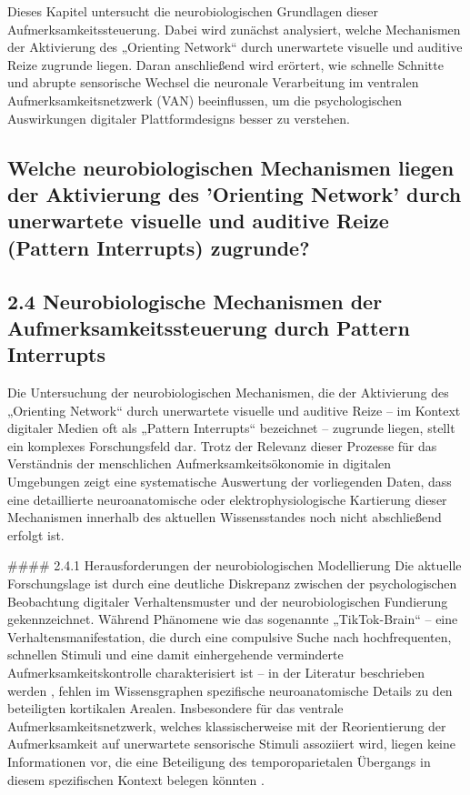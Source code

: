 \documentclass[11pt,a4paper]{article}
\begin{document}
Dieses Kapitel untersucht die neurobiologischen Grundlagen dieser Aufmerksamkeitssteuerung. Dabei wird zunächst analysiert, welche Mechanismen der Aktivierung des „Orienting Network“ durch unerwartete visuelle und auditive Reize zugrunde liegen. Daran anschließend wird erörtert, wie schnelle Schnitte und abrupte sensorische Wechsel die neuronale Verarbeitung im ventralen Aufmerksamkeitsnetzwerk (VAN) beeinflussen, um die psychologischen Auswirkungen digitaler Plattformdesigns besser zu verstehen.

\subsection{Welche neurobiologischen Mechanismen liegen der Aktivierung des 'Orienting Network' durch unerwartete visuelle und auditive Reize (Pattern Interrupts) zugrunde?}

\subsection{2.4 Neurobiologische Mechanismen der Aufmerksamkeitssteuerung durch Pattern Interrupts}

Die Untersuchung der neurobiologischen Mechanismen, die der Aktivierung des „Orienting Network“ durch unerwartete visuelle und auditive Reize – im Kontext digitaler Medien oft als „Pattern Interrupts“ bezeichnet – zugrunde liegen, stellt ein komplexes Forschungsfeld dar. Trotz der Relevanz dieser Prozesse für das Verständnis der menschlichen Aufmerksamkeitsökonomie in digitalen Umgebungen zeigt eine systematische Auswertung der vorliegenden Daten, dass eine detaillierte neuroanatomische oder elektrophysiologische Kartierung dieser Mechanismen innerhalb des aktuellen Wissensstandes noch nicht abschließend erfolgt ist.

\#\#\#\# 2.4.1 Herausforderungen der neurobiologischen Modellierung Die aktuelle Forschungslage ist durch eine deutliche Diskrepanz zwischen der psychologischen Beobachtung digitaler Verhaltensmuster und der neurobiologischen Fundierung gekennzeichnet. Während Phänomene wie das sogenannte „TikTok-Brain“ – eine Verhaltensmanifestation, die durch eine compulsive Suche nach hochfrequenten, schnellen Stimuli und eine damit einhergehende verminderte Aufmerksamkeitskontrolle charakterisiert ist – in der Literatur beschrieben werden \autocite{crossref_10_51473_rcmos_v1i2_2025_1736}, fehlen im Wissensgraphen spezifische neuroanatomische Details zu den beteiligten kortikalen Arealen. Insbesondere für das ventrale Aufmerksamkeitsnetzwerk, welches klassischerweise mit der Reorientierung der Aufmerksamkeit auf unerwartete sensorische Stimuli assoziiert wird, liegen keine Informationen vor, die eine Beteiligung des temporoparietalen Übergangs in diesem spezifischen Kontext belegen könnten \autocite{arxiv_2112_03879,arxiv_2509_08841,arxiv_2301_09025}.
\end{document}
